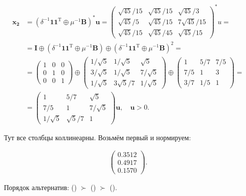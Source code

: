 \documentclass[specialist,
	substylefile = spbu.rtx,
	subf,href,colorlinks=true, 12pt]{disser}
\begin{document}
\begin{align*}
	\mathbf{x_2} & = (\delta^{-1}\mathbf{1}\mathbf{1}^\mathrm{T} \oplus \mu^{-1}\mathbf{B})^*\mathbf{u} = \begin{pmatrix}\sqrt{45}/15 & \sqrt{45}/15 & \sqrt{45}/3\\ \sqrt{45}/5 & \sqrt{45}/15 & 7\sqrt{45}/15 \\ \sqrt{45}/15 & \sqrt{45}/45 & \sqrt{45}/15 \end{pmatrix}^*u =                   \\
	                 & = \mathbf{I} \oplus (\delta^{-1}\mathbf{1}\mathbf{1}^\mathrm{T} \oplus \mu^{-1}\mathbf{B}) \oplus (\delta^{-1}\mathbf{1}\mathbf{1}^\mathrm{T} \oplus \mu^{-1}\mathbf{B})^2 = \\
	                 & = \begin{pmatrix} 1&0&0 \\ 0&1&0 \\ 0&0&1 \end{pmatrix}
	\oplus
	\begin{pmatrix}1/\sqrt{5}&1/\sqrt{5}&\sqrt{5}\\3/\sqrt{5}&1/\sqrt{5}&7/\sqrt{5}\\1/\sqrt{5}&3\sqrt{5}/7&1/\sqrt{5}\end{pmatrix}
	\oplus
	\begin{pmatrix}1&5/7&7/5\\7/5&1&3\\3/7&1/5&1\end{pmatrix}             =                                                                        \\
	                 & = \begin{pmatrix} 1&5/7&\sqrt{5}\\ 7/5&1&7/\sqrt{5}\\ 1/\sqrt{5}&\sqrt{5}/7&1 \end{pmatrix}\mathbf{u}, \quad \mathbf{u} > 0.
\end{align*}

Тут все столбцы коллинеарны. Возьмём первый и нормируем:

\begin{align*}
	\begin{pmatrix}0.3512\\0.4917\\0.1570\end{pmatrix}.
\end{align*}

Порядок альтернатив: () \(\succ\) () \(\succ\) ().
\end{document}
